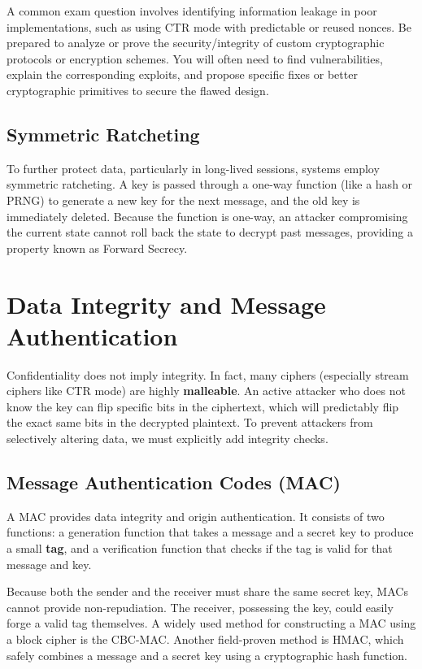 \begin{tcolorbox}[colback=blue!5!white,colframe=blue!75!black,title=Exam Insight]
A common exam question involves identifying information leakage in poor implementations, such as using CTR mode with predictable or reused nonces. Be prepared to analyze or prove the security/integrity of custom cryptographic protocols or encryption schemes. You will often need to find vulnerabilities, explain the corresponding exploits, and propose specific fixes or better cryptographic primitives to secure the flawed design.
\end{tcolorbox}

\subsection{Symmetric Ratcheting}
To further protect data, particularly in long-lived sessions, systems employ symmetric ratcheting. A key is passed through a one-way function (like a hash or PRNG) to generate a new key for the next message, and the old key is immediately deleted. Because the function is one-way, an attacker compromising the current state cannot roll back the state to decrypt past messages, providing a property known as Forward Secrecy.

\section{Data Integrity and Message Authentication}

Confidentiality does not imply integrity. In fact, many ciphers (especially stream ciphers like CTR mode) are highly \textbf{malleable}. An active attacker who does not know the key can flip specific bits in the ciphertext, which will predictably flip the exact same bits in the decrypted plaintext. To prevent attackers from selectively altering data, we must explicitly add integrity checks.

\subsection{Message Authentication Codes (MAC)}
A MAC provides data integrity and origin authentication. It consists of two functions: a generation function that takes a message and a secret key to produce a small \textbf{tag}, and a verification function that checks if the tag is valid for that message and key. 

Because both the sender and the receiver must share the same secret key, MACs cannot provide non-repudiation. The receiver, possessing the key, could easily forge a valid tag themselves. A widely used method for constructing a MAC using a block cipher is the CBC-MAC. Another field-proven method is HMAC, which safely combines a message and a secret key using a cryptographic hash function.

